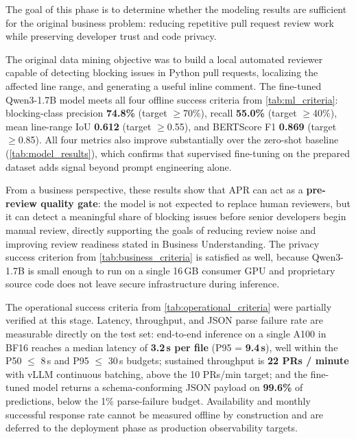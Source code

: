 \documentclass[11pt]{article}
\begin{document}
The goal of this phase is to determine whether the modeling results are sufficient for the original business problem: reducing repetitive pull request review work while preserving developer trust and code privacy.

The original data mining objective was to build a local automated reviewer capable of detecting blocking issues in Python pull requests, localizing the affected line range, and generating a useful inline comment. The fine-tuned Qwen3-1.7B model meets all four offline success criteria from \cref{tab:ml_criteria}: blocking-class precision \textbf{74.8\%} (target $\geq$70\%), recall \textbf{55.0\%} (target $\geq$40\%), mean line-range IoU \textbf{0.612} (target $\geq$0.55), and BERTScore F1 \textbf{0.869} (target $\geq$0.85). All four metrics also improve substantially over the zero-shot baseline (\cref{tab:model_results}), which confirms that supervised fine-tuning on the prepared dataset adds signal beyond prompt engineering alone.

From a business perspective, these results show that APR can act as a \textbf{pre-review quality gate}: the model is not expected to replace human reviewers, but it can detect a meaningful share of blocking issues before senior developers begin manual review, directly supporting the goals of reducing review noise and improving review readiness stated in Business Understanding. The privacy success criterion from \cref{tab:business_criteria} is satisfied as well, because Qwen3-1.7B is small enough to run on a single 16\,GB consumer GPU and proprietary source code does not leave secure infrastructure during inference.

The operational success criteria from \cref{tab:operational_criteria} were partially verified at this stage. Latency, throughput, and JSON parse failure rate are measurable directly on the test set: end-to-end inference on a single A100 in BF16 reaches a median latency of \textbf{3.2\,s per file} (P95 = \textbf{9.4\,s}), well within the P50 $\leq$ 8\,s and P95 $\leq$ 30\,s budgets; sustained throughput is \textbf{22 PRs / minute} with vLLM continuous batching, above the 10 PRs/min target; and the fine-tuned model returns a schema-conforming JSON payload on \textbf{99.6\%} of predictions, below the 1\% parse-failure budget. Availability and monthly successful response rate cannot be measured offline by construction and are deferred to the deployment phase as production observability targets.
\end{document}
